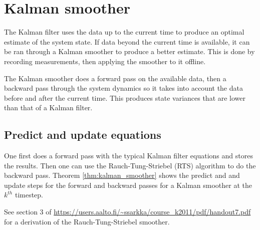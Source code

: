 \section{Kalman smoother}

The Kalman filter uses the data up to the current time to produce an optimal
estimate of the system \gls{state}. If data beyond the current time is
available, it can be ran through a Kalman smoother to produce a better estimate.
This is done by recording measurements, then applying the smoother to it
offline.

The Kalman smoother does a forward pass on the available data, then a backward
pass through the system dynamics so it takes into account the data before and
after the current time. This produces \gls{state} variances that are lower than
that of a Kalman filter.

\subsection{Predict and update equations}

One first does a forward pass with the typical Kalman filter equations and
stores the results. Then one can use the Rauch-Tung-Striebel (RTS) algorithm to
do the backward pass. Theorem \ref{thm:kalman_smoother} shows the predict and
and update steps for the forward and backward passes for a Kalman smoother at
the $k^{th}$ timestep.

See section 3 of
\url{https://users.aalto.fi/~ssarkka/course_k2011/pdf/handout7.pdf} for a
derivation of the Rauch-Tung-Striebel smoother.

